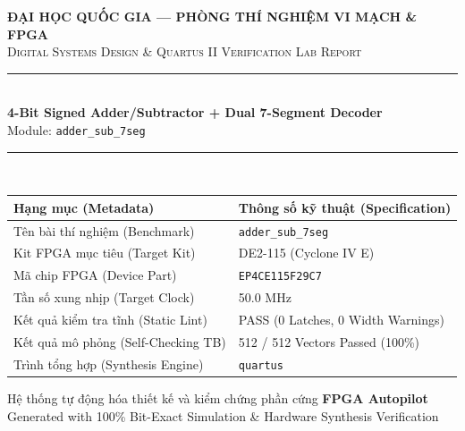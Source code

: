 \documentclass[11pt,a4paper]{article}
\begin{document}
\begin{titlepage}

    \centering
    \vspace*{1.6cm}
    {\Large\bfseries\textcolor{deepblue}{ĐẠI HỌC QUỐC GIA — PHÒNG THÍ NGHIỆM VI MẠCH \& FPGA}\\[0.3cm]}
    {\large\textsc{Digital Systems Design \& Quartus II Verification Lab Report}}\\[1.2cm]

    \rule{0.82\textwidth}{1.2pt}\\[0.5cm]
    {\huge\bfseries\textcolor{deepblue}{4-Bit Signed Adder/Subtractor + Dual 7-Segment Decoder}}\\[0.4cm]
    {\Large Module: \texttt{adder\_sub\_7seg}}\\[0.4cm]
    \rule{0.82\textwidth}{1.2pt}\\[1.4cm]

    \begin{tabularx}{0.84\textwidth}{@{}lX@{}}
        \toprule
        \textbf{Hạng mục (Metadata)} & \textbf{Thông số kỹ thuật (Specification)} \\
        \midrule
        Tên bài thí nghiệm (Benchmark) & \texttt{adder\_sub\_7seg} \\
        Kit FPGA mục tiêu (Target Kit) & DE2-115 (Cyclone IV E) \\
        Mã chip FPGA (Device Part) & \texttt{EP4CE115F29C7} \\
        Tần số xung nhịp (Target Clock) & 50.0 MHz \\
        Kết quả kiểm tra tĩnh (Static Lint) & PASS (0 Latches, 0 Width Warnings) \\
        Kết quả mô phỏng (Self-Checking TB) & 512 / 512 Vectors Passed (100\%) \\
        Trình tổng hợp (Synthesis Engine) & \texttt{quartus} \\
        \bottomrule
    \end{tabularx}

    \vfill
    {\normalsize Hệ thống tự động hóa thiết kế và kiểm chứng phần cứng \textbf{FPGA Autopilot}}\\[0.2cm]
    {\small Generated with 100\% Bit-Exact Simulation \& Hardware Synthesis Verification}
    \vspace*{1.2cm}
\end{titlepage}
\end{document}
